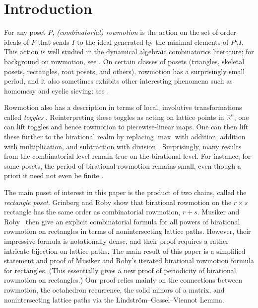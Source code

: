 \section{Introduction}

For any poset $P$, \emph{(combinatorial) rowmotion} is the action on the set of order ideals of $P$ that sends $I$ to the ideal generated by the minimal elements of $P \setminus I$. This action is well studied in the dynamical algebraic combinatorics literature; for background on rowmotion, see \cite{strikerwilliams}. %
On certain classes of posets (triangles, skeletal posets, rectangles, root posets, and others), rowmotion has a surprisingly small period, and it also sometimes exhibits other interesting phenomena such as homomesy and cyclic sieving: see \cite{einsteinpropp1,hopkins3,josephroby1,musikerroby,propproby,thomaswilliams}.

Rowmotion also has a description in terms of local, involutive transformations called \emph{toggles} \cite{cameronfonderflaass}. Reinterpreting these toggles as acting on lattice points in $\mathbb R^n$, one can lift toggles and hence rowmotion to piecewise-linear maps. One can then lift these further to the birational realm by replacing $\max$ with addition, addition with multiplication, and subtraction with division \cite{einsteinpropp2,einsteinpropp1}. Surprisingly, many results from the combinatorial level remain true on the birational level. For instance, for some posets, the period of birational rowmotion remains small, even though a priori it need not even be finite \cite{grinbergroby2,grinbergroby1}.

The main poset of interest in this paper is the product of two chains, called the \emph{rectangle poset}. Grinberg and Roby \cite{grinbergroby2} show that birational rowmotion on the $r \times s$ rectangle has the same order as combinatorial rowmotion, $r+s$.  Musiker and Roby~\cite{musikerroby} then give an explicit combinatorial formula for all powers of birational rowmotion on rectangles in terms of nonintersecting lattice paths. However, their impressive formula is notationally dense, and their proof requires a rather intricate bijection on lattice paths. The main result of this paper is a simplified statement and proof of Musiker and Roby's iterated birational rowmotion formula for rectangles. (This essentially gives a new proof of periodicity of birational rowmotion on rectangles.) Our proof relies mainly on the connections between rowmotion, the octahedron recurrence, the solid minors of a matrix, and nonintersecting lattice paths via the Lindstr\"om--Gessel--Viennot Lemma.

